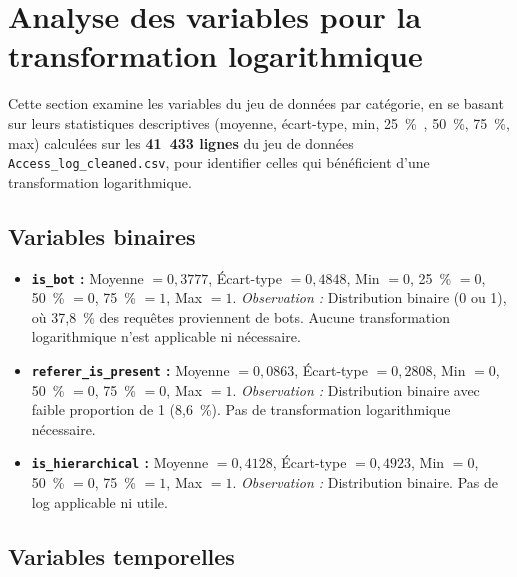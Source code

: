 \documentclass[a4paper,12pt]{article}
\begin{document}
\section{Analyse des variables pour la transformation logarithmique}

Cette section examine les variables du jeu de données par catégorie, en se basant sur leurs statistiques descriptives (moyenne, écart-type, min, 25~\%~, 50~\%, 75~\%, max) calculées sur les \textbf{41~433 lignes} du jeu de données \texttt{Access\_log\_cleaned.csv}, pour identifier celles qui bénéficient d'une transformation logarithmique.

\subsection{Variables binaires}

\begin{itemize}
  \item \textbf{\texttt{is\_bot} :} Moyenne $= 0{,}3777$, Écart-type $= 0{,}4848$, Min $= 0$, 25~\% $= 0$, 50~\% $= 0$, 75~\% $= 1$, Max $= 1$. \emph{Observation :} Distribution binaire (0 ou 1), où 37{,}8~\% des requêtes proviennent de bots. Aucune transformation logarithmique n'est applicable ni nécessaire.
  \item \textbf{\texttt{referer\_is\_present} :} Moyenne $= 0{,}0863$, Écart-type $= 0{,}2808$, Min $= 0$, 50~\% $= 0$, 75~\% $= 0$, Max $= 1$. \emph{Observation :} Distribution binaire avec faible proportion de 1 (8{,}6~\%). Pas de transformation logarithmique nécessaire.
  \item \textbf{\texttt{is\_hierarchical} :} Moyenne $= 0{,}4128$, Écart-type $= 0{,}4923$, Min $= 0$, 50~\% $= 0$, 75~\% $= 1$, Max $= 1$. \emph{Observation :} Distribution binaire. Pas de log applicable ni utile.
\end{itemize}

\subsection{Variables temporelles}
\end{document}
